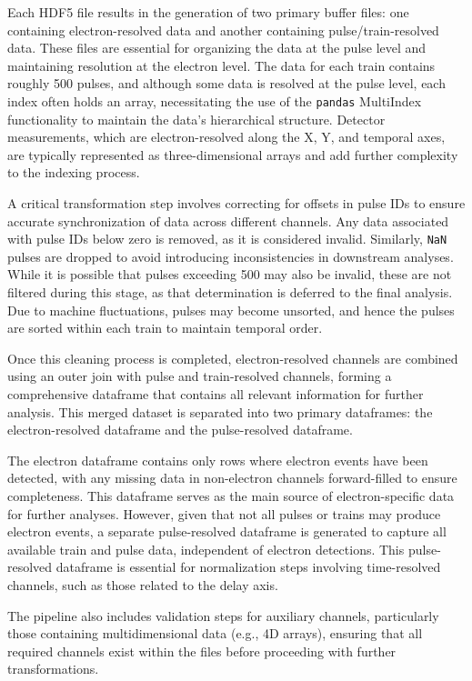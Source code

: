 Each \gls{HDF5} file results in the generation of two primary buffer files: one containing electron-resolved data and another containing pulse/train-resolved data. These files are essential for organizing the data at the pulse level and maintaining resolution at the electron level. The data for each train contains roughly 500 pulses, and although some data is resolved at the pulse level, each index often holds an array, necessitating the use of the \texttt{pandas} MultiIndex functionality to maintain the data’s hierarchical structure. Detector measurements, which are electron-resolved along the X, Y, and temporal axes, are typically represented as three-dimensional arrays and add further complexity to the indexing process.

A critical transformation step involves correcting for offsets in pulse IDs to ensure accurate synchronization of data across different channels. Any data associated with pulse IDs below zero is removed, as it is considered invalid. Similarly, \texttt{NaN} pulses are dropped to avoid introducing inconsistencies in downstream analyses. While it is possible that pulses exceeding 500 may also be invalid, these are not filtered during this stage, as that determination is deferred to the final analysis. Due to machine fluctuations, pulses may become unsorted, and hence the pulses are sorted within each train to maintain temporal order.

Once this cleaning process is completed, electron-resolved channels are combined using an outer join with pulse and train-resolved channels, forming a comprehensive dataframe that contains all relevant information for further analysis. This merged dataset is separated into two primary dataframes: the electron-resolved dataframe and the pulse-resolved dataframe.

The electron dataframe contains only rows where electron events have been detected, with any missing data in non-electron channels forward-filled to ensure completeness. This dataframe serves as the main source of electron-specific data for further analyses. However, given that not all pulses or trains may produce electron events, a separate pulse-resolved dataframe is generated to capture all available train and pulse data, independent of electron detections. This pulse-resolved dataframe is essential for normalization steps involving time-resolved channels, such as those related to the delay axis.

The pipeline also includes validation steps for auxiliary channels, particularly those containing multidimensional data (e.g., 4D arrays), ensuring that all required channels exist within the files before proceeding with further transformations.

